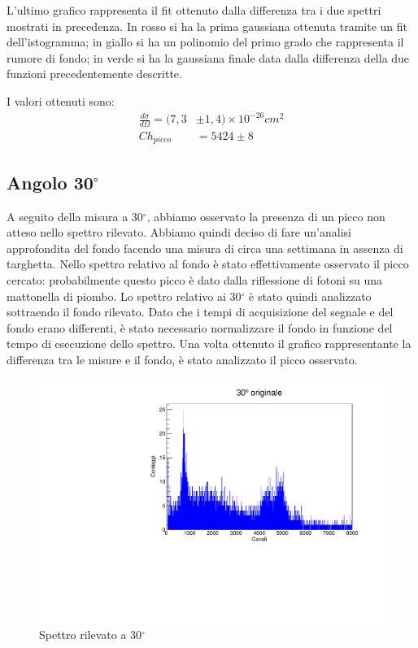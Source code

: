 \documentclass[italian,11pt]{report}
\begin{document}
L'ultimo grafico rappresenta il fit ottenuto dalla differenza tra i due spettri mostrati in precedenza. In rosso si ha la prima gaussiana ottenuta tramite un fit dell'istogramma; in giallo si ha un polinomio del primo grado che rappresenta il rumore di fondo; in verde si ha la gaussiana finale data dalla differenza della due funzioni precedentemente descritte.

\vspace{1cm}
I valori ottenuti sono:
\begin{align*}
\frac{d\sigma}{d\Omega} =(7,3&\pm1,4)\times10^{-26} cm^2 \\
Ch_{picco}&=5424\pm8
\end{align*}

\vspace{3cm}
\subsection{Angolo 30$^\circ$}
A seguito della misura a 30$^\circ$, abbiamo osservato la presenza di un picco non atteso nello spettro rilevato. Abbiamo quindi deciso di fare un'analisi approfondita del fondo facendo una misura di circa una settimana in assenza di targhetta. Nello spettro relativo al fondo è stato effettivamente osservato il picco cercato: probabilmente questo picco è dato dalla riflessione di fotoni su una mattonella di piombo. Lo spettro relativo ai 30$^\circ$ è stato quindi analizzato sottraendo il fondo rilevato. Dato che i tempi di acquisizione del segnale e del fondo erano differenti, è stato necessario normalizzare il fondo in funzione del tempo di esecuzione dello spettro. Una volta ottenuto il grafico rappresentante la differenza tra le misure e il fondo, è stato analizzato il picco osservato.
\begin{figure}[!htp]
\centering
\includegraphics[width=12cm]{30originale.pdf}
\caption{Spettro rilevato a 30$^\circ$}
\end{figure}
\end{document}
